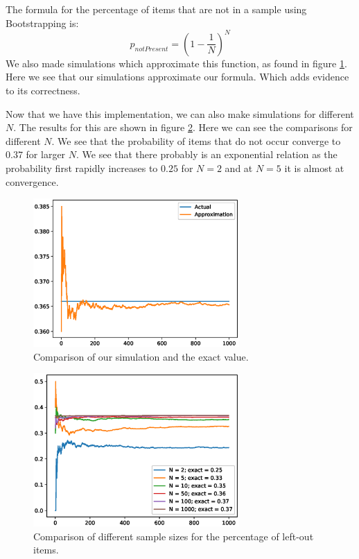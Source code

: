 \documentclass[11pt]{article}
\begin{document}
\section{}
The formula for the percentage of items that are not in a sample using Bootstrapping is:
\[
	p_{notPresent} = (1 - \frac{1}{N})^N
\]
We also made simulations which approximate this function, as found in figure \ref{fig:approx_vs_real}. Here we see that our simulations approximate our formula. Which adds evidence to its correctness.

Now that we have this implementation, we can also make simulations for different $N$. The results for this are shown in figure \ref{fig:leftout}. Here we can see the comparisons for different $N$. We see that the probability of items that do not occur converge to $0.37$ for larger $N$. We see that there probably is an exponential relation as the probability first rapidly increases to $0.25$ for $N = 2$ and at $N=5$ it is almost at convergence.

\begin{figure}[H]
	\centering
	\includegraphics[width=0.7\textwidth]{images/approx_vs_real.eps}
	\caption{Comparison of our simulation and the exact value.}
	\label{fig:approx_vs_real}
\end{figure}

\begin{figure}[H]
	\centering
	\includegraphics[width=0.7\textwidth]{images/different_sample_sizes.eps}
	\caption{Comparison of different sample sizes for the percentage of left-out items.}
	\label{fig:leftout}
\end{figure}
\end{document}
